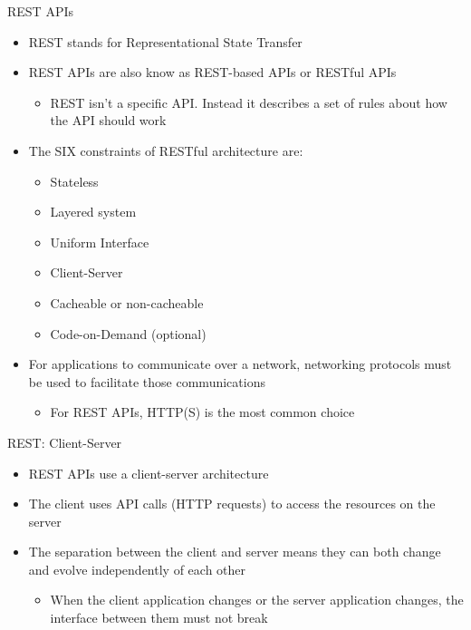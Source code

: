 REST APIs

\begin{itemize}
\tightlist
\item
  REST stands for Representational State Transfer
\item
  REST APIs are also know as REST-based APIs or RESTful APIs

  \begin{itemize}
  \tightlist
  \item
    REST isn't a specific API. Instead it describes a set of rules about
    how the API should work
  \end{itemize}
\item
  The SIX constraints of RESTful architecture are:

  \begin{itemize}
  \tightlist
  \item
    Stateless
  \item
    Layered system
  \item
    Uniform Interface
  \item
    Client-Server
  \item
    Cacheable or non-cacheable
  \item
    Code-on-Demand (optional)
  \end{itemize}
\item
  For applications to communicate over a network, networking protocols
  must be used to facilitate those communications

  \begin{itemize}
  \tightlist
  \item
    For REST APIs, HTTP(S) is the most common choice
  \end{itemize}
\end{itemize}

REST: Client-Server

\begin{itemize}
\tightlist
\item
  REST APIs use a client-server architecture
\item
  The client uses API calls (HTTP requests) to access the resources on
  the server
\item
  The separation between the client and server means they can both
  change and evolve independently of each other

  \begin{itemize}
  \tightlist
  \item
    When the client application changes or the server application
    changes, the interface between them must not break
  \end{itemize}
\end{itemize}

